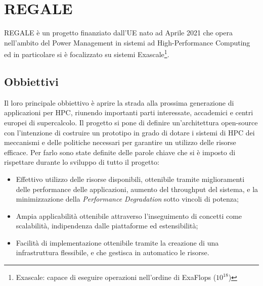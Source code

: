 \chapter{REGALE}\label{chap:4_REGALE}
REGALE\cite{REGALE} è un progetto finanziato dall'UE\cite{ue_REGALE} nato ad Aprile 2021 che opera nell'ambito del Power Management in sistemi ad High-Performance Computing ed in particolare si è focalizzato su sistemi Exascale\footnote{Exascale: capace di eseguire operazioni nell'ordine di ExaFlops ($10^{18}$)}.

\section{Obbiettivi}
Il loro principale obbiettivo è aprire la strada alla prossima generazione di applicazioni per HPC, riunendo importanti parti interessate, accademici e centri europei di supercalcolo. Il progetto si pone di definire un'architettura open-source con l'intenzione di costruire un prototipo in grado di dotare i sistemi di HPC dei meccanismi e delle politiche necessari per garantire un utilizzo delle risorse efficace\cite{ue_REGALE}. Per farlo sono state definite delle parole chiave che si è imposto di rispettare durante lo sviluppo di tutto il progetto:
\begin{itemize}
    \item Effettivo utilizzo delle risorse disponibili, ottenibile tramite miglioramenti delle performance delle applicazioni, aumento del throughput del sistema, e la minimizzazione della \emph{Performance Degradation} sotto vincoli di potenza;
    \item Ampia applicabilità ottenibile attraverso l'inseguimento di concetti come scalabilità, indipendenza dalle piattaforme ed estensibilità;
    \item Facilità di implementazione ottenibile tramite la creazione di una infrastruttura flessibile, e che gestisca in automatico le risorse.
\end{itemize}


